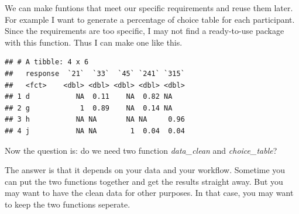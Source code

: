 \documentclass[]{book}
\newenvironment{Shaded}{\begin{snugshade}}{\end{snugshade}}
\newcommand{\KeywordTok}[1]{\textcolor[rgb]{0.13,0.29,0.53}{\textbf{#1}}}
\newcommand{\DataTypeTok}[1]{\textcolor[rgb]{0.13,0.29,0.53}{#1}}
\newcommand{\DecValTok}[1]{\textcolor[rgb]{0.00,0.00,0.81}{#1}}
\newcommand{\StringTok}[1]{\textcolor[rgb]{0.31,0.60,0.02}{#1}}
\newcommand{\CommentTok}[1]{\textcolor[rgb]{0.56,0.35,0.01}{\textit{#1}}}
\newcommand{\ControlFlowTok}[1]{\textcolor[rgb]{0.13,0.29,0.53}{\textbf{#1}}}
\newcommand{\OperatorTok}[1]{\textcolor[rgb]{0.81,0.36,0.00}{\textbf{#1}}}
\newcommand{\NormalTok}[1]{#1}
\begin{document}
We can make funtions that meet our specific requirements and reuse them
later. For example I want to generate a percentage of choice table for
each participant. Since the requirements are too specific, I may not
find a ready-to-use package with this function. Thus I can make one like
this.

\begin{Shaded}
\end{Shaded}

\begin{verbatim}
## # A tibble: 4 x 6
##   response  `21`  `33`  `45` `241` `315`
##   <fct>    <dbl> <dbl> <dbl> <dbl> <dbl>
## 1 d           NA  0.11    NA  0.82 NA   
## 2 g            1  0.89    NA  0.14 NA   
## 3 h           NA NA       NA NA     0.96
## 4 j           NA NA        1  0.04  0.04
\end{verbatim}

Now the question is: do we need two function \emph{data\_clean} and
\emph{choice\_table}?

The answer is that it depends on your data and your workflow. Sometime
you can put the two functions together and get the results straight
away. But you may want to have the clean data for other purposes. In
that case, you may want to keep the two functions seperate.
\end{document}
